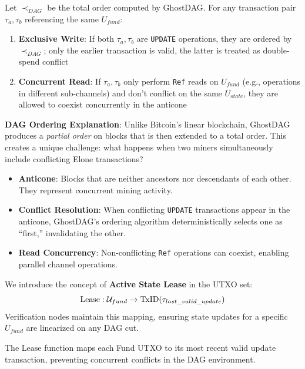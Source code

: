 \begin{definition}
Let $\prec_{DAG}$ be the total order computed by GhostDAG. For any transaction pair $\tau_a, \tau_b$ referencing the same $U_{fund}$:
\begin{enumerate}
    \item \textbf{Exclusive Write}: If both $\tau_a, \tau_b$ are \texttt{UPDATE} operations, they are ordered by $\prec_{DAG}$; only the earlier transaction is valid, the latter is treated as double-spend conflict
    \item \textbf{Concurrent Read}: If $\tau_a, \tau_b$ only perform \texttt{Ref} reads on $U_{fund}$ (e.g., operations in different sub-channels) and don't conflict on the same $U_{state}$, they are allowed to coexist concurrently in the anticone
\end{enumerate}
\end{definition}

\textbf{DAG Ordering Explanation}:
Unlike Bitcoin's linear blockchain, GhostDAG produces a \textit{partial order} on blocks that is then extended to a total order. This creates a unique challenge: what happens when two miners simultaneously include conflicting Elone transactions?

\begin{itemize}
    \item \textbf{Anticone}: Blocks that are neither ancestors nor descendants of each other. They represent concurrent mining activity.
    \item \textbf{Conflict Resolution}: When conflicting \texttt{UPDATE} transactions appear in the anticone, GhostDAG's ordering algorithm deterministically selects one as ``first,'' invalidating the other.
    \item \textbf{Read Concurrency}: Non-conflicting \texttt{Ref} operations can coexist, enabling parallel channel operations.
\end{itemize}

\begin{definition}
We introduce the concept of \textbf{Active State Lease} in the UTXO set:
$$\text{Lease}: \mathcal{U}_{fund} \to \text{TxID}(\tau_{last\_valid\_update})$$
Verification nodes maintain this mapping, ensuring state updates for a specific $U_{fund}$ are linearized on any DAG cut.
\end{definition}

The $\text{Lease}$ function maps each Fund UTXO to its most recent valid update transaction, preventing concurrent conflicts in the DAG environment.

